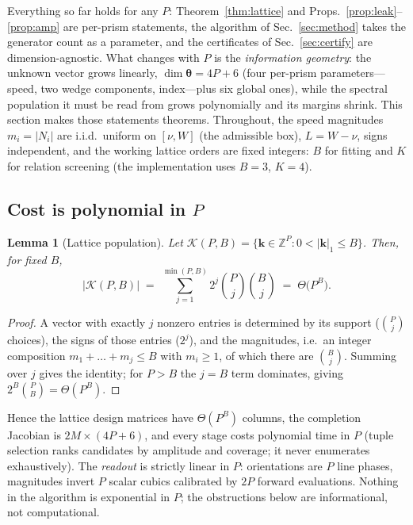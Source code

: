 \documentclass[twocolumn,preprintnumbers,amsmath,amssymb,pra,floatfix]{revtex4-2}
\newcommand{\vect}[1]{\bm{#1}}
\newtheorem{lemma}{Lemma}
\begin{document}
Everything so far holds for any $P$: Theorem~\ref{thm:lattice} and
Props.~\ref{prop:leak}--\ref{prop:amp} are per-prism statements, the
algorithm of Sec.~\ref{sec:method} takes the generator count as a
parameter, and the certificates of Sec.~\ref{sec:certify} are
dimension-agnostic.  What changes with $P$ is the \emph{information
geometry}: the unknown vector grows linearly,
$\dim\vect{\theta}=4P+6$ (four per-prism parameters---speed, two
wedge components, index---plus six global ones), while the spectral
population it must be read from grows polynomially and its margins
shrink.  This section makes those statements theorems.  Throughout,
the speed magnitudes $m_i=|N_i|$ are i.i.d.\ uniform on $[\nu,W]$
(the admissible box), $L=W-\nu$, signs independent, and the working
lattice orders are fixed integers: $B$ for fitting and $K$ for
relation screening (the implementation uses $B{=}3$, $K{=}4$).

\subsection{Cost is polynomial in $P$}

\begin{lemma}[Lattice population]
\label{lem:count}
Let $\mathcal{K}(P,B)=\{\vect{k}\in\mathbb{Z}^{P}:0<|\vect{k}|_{1}\le
B\}$.  Then, for fixed $B$,
\begin{equation}
  |\mathcal{K}(P,B)| \;=\; \sum_{j=1}^{\min(P,B)} 2^{j}
  \binom{P}{j}\binom{B}{j}
  \;=\;\Theta\!\bigl(P^{B}\bigr).
  \label{eq:count}
\end{equation}
\end{lemma}
\begin{proof}
A vector with exactly $j$ nonzero entries is determined by its support
($\binom{P}{j}$ choices), the signs of those entries ($2^{j}$), and
the magnitudes, i.e.\ an integer composition
$m_{1}+\dots+m_{j}\le B$ with $m_{i}\ge1$, of which there are
$\binom{B}{j}$.  Summing over $j$ gives the identity; for $P>B$ the
$j=B$ term dominates, giving
$2^{B}\binom{P}{B}=\Theta(P^{B})$.
\end{proof}

Hence the lattice design matrices have $\Theta(P^{B})$ columns, the
completion Jacobian is $2M\times(4P+6)$, and every stage costs
polynomial time in $P$ (tuple selection ranks candidates by amplitude
and coverage; it never enumerates exhaustively).  The \emph{readout}
is strictly linear in $P$: orientations are $P$ line phases,
magnitudes invert $P$ scalar cubics calibrated by $2P$ forward
evaluations.  Nothing in the algorithm is exponential in $P$; the
obstructions below are informational, not computational.
\end{document}
